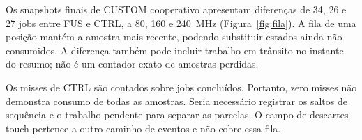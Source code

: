 Os snapshots finais de CUSTOM cooperativo apresentam diferenças de 34, 26 e 27 jobs entre FUS e CTRL, a 80, 160 e 240~MHz (Figura~\ref{fig:fila}). A fila de uma posição mantém a amostra mais recente, podendo substituir estados ainda não consumidos. A diferença também pode incluir trabalho em trânsito no instante do resumo; não é um contador exato de amostras perdidas.

Os misses de CTRL são contados sobre jobs concluídos. Portanto, zero misses não demonstra consumo de todas as amostras. Seria necessário registrar os saltos de sequência e o trabalho pendente para separar as parcelas. O campo de descartes touch pertence a outro caminho de eventos e não cobre essa fila.


\FloatBarrier
